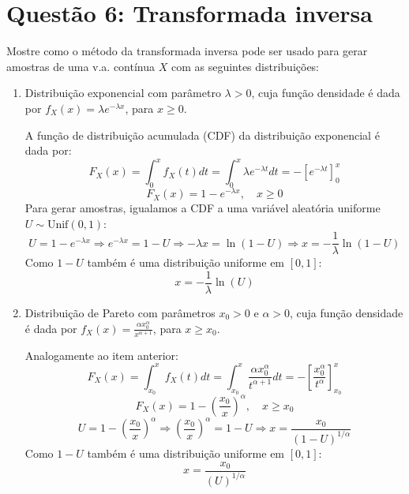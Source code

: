 \documentclass[12 pt]{article}
\begin{document}
\section*{Questão 6: Transformada inversa}

Mostre como o método da transformada inversa pode ser usado para gerar amostras de uma v.a. contínua $X$ com as seguintes distribuições:

\begin{enumerate}
    \item Distribuição exponencial com parâmetro $\lambda > 0$, cuja função densidade é dada por $f_X(x) = \lambda e^{-\lambda x}$, para $x \geq 0$.
    \begin{tcolorbox}[colframe=black, title=Resposta:]
        A função de distribuição acumulada (CDF) da distribuição exponencial é dada por:
        $$
        F_X(x) = \int_0^x f_X(t) dt = \int_0^x \lambda e^{-\lambda t} dt = -\left[e^{-\lambda t}\right]_0^x
        $$
        $$
        F_X(x) = 1 - e^{-\lambda x}, \quad x \geq 0
        $$
        Para gerar amostras, igualamos a CDF a uma variável aleatória uniforme $U \sim \text{Unif}(0, 1)$:
        $$
        U =  1 - e^{-\lambda x} \Rightarrow e^{-\lambda x} = 1-U \Rightarrow -\lambda x = \ln(1-U) \Rightarrow x = -\frac{1}{\lambda} \ln(1-U)
        $$
        Como $1-U$ também é uma distribuição uniforme em $[0,1]$: 
        $$
        \boxed{x = -\frac{1}{\lambda} \ln(U)}
        $$

    \end{tcolorbox}
    \item Distribuição de Pareto com parâmetros $x_0 > 0$ e $\alpha > 0$, cuja função densidade é dada por $f_X(x) = \frac{\alpha x_0^\alpha}{x^{\alpha + 1}}$, para $x \geq x_0$.
    \begin{tcolorbox}[colframe=black, title=Resposta:]
        Analogamente ao item anterior:
        $$
        F_X(x) = \int_{x_0}^x f_X(t) dt = \int_{x_0}^x \frac{\alpha x_0^\alpha}{t^{\alpha + 1}} dt = -\left[\frac{x_0^\alpha}{t^\alpha}\right]_{x_0}^x
        $$
        $$
        F_X(x) = 1 - \left(\frac{x_0}{x}\right)^\alpha, \quad x \geq x_0
        $$
        $$
        U = 1 - \left(\frac{x_0}{x}\right)^\alpha \Rightarrow \left(\frac{x_0}{x}\right)^\alpha = 1-U \Rightarrow x = \frac{x_0}{(1-U)^{1/\alpha}}
        $$
        Como $1-U$ também é uma distribuição uniforme em $[0,1]$:
        $$
        \boxed{x = \frac{x_0}{(U)^{1/\alpha}}}
        $$
    \end{tcolorbox}
\end{enumerate}
\end{document}
